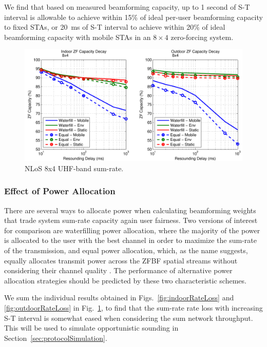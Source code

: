 We find that based on measured beamforming capacity, up to 1 second of S-T interval is allowable to achieve within 15\% of ideal per-user beamforming capacity to fixed \acp{STA}, or 20~ms of S-T interval to achieve within 20\% of ideal beamforming capacity with mobile \acp{STA} in an $8\times4$ zero-forcing system.


\begin{figure}[t] %
\centering
\includegraphics[width=1\linewidth]{./figs/protocol/sum_rate_loss_w_pow_alloc}
\caption{\ac{NLoS} 8x4 UHF-band sum-rate.}
\label{fig_power_allocation}
\end{figure}

\subsubsection{Effect of Power Allocation}
\label{sec_mobile_sum_rate}

	There are several ways to allocate power when calculating beamforming weights that trade system sum-rate capacity again user fairness.
	Two versions of interest for comparison are waterfilling power allocation, where the majority of the power is allocated to the user with the best channel in order to maximize the sum-rate of the transmission, and equal power allocation, which, as the name suggests, equally allocates transmit power across the \ac{ZFBF} spatial streams without considering their channel quality \cite{spencer2004zero}.
	The performance of alternative power allocation strategies should be predicted by these two characteristic schemes.
	
	We sum the individual results obtained in Figs.~\ref{fig:indoorRateLoss} and \ref{fig:outdoorRateLoss} in Fig.~\ref{fig_power_allocation}, to find that the sum-rate rate loss with increasing S-T interval is somewhat eased when considering the sum network throughput.
	This will be used to simulate opportunistic sounding in Section~\ref{sec:protocolSimulation}.
	
